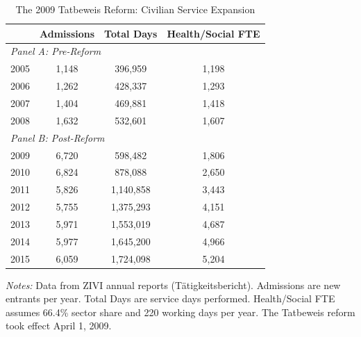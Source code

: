 \begin{table}[htbp]
\centering
\caption{The 2009 Tatbeweis Reform: Civilian Service Expansion}
\label{tab:reform}
\begin{threeparttable}
\begin{tabular}{lccc}
\toprule
 & Admissions & Total Days & Health/Social FTE \\
\midrule
\multicolumn{4}{l}{\textit{Panel A: Pre-Reform}} \\
2005 & 1,148 & 396,959 & 1,198 \\
2006 & 1,262 & 428,337 & 1,293 \\
2007 & 1,404 & 469,881 & 1,418 \\
2008 & 1,632 & 532,601 & 1,607 \\
\midrule
\multicolumn{4}{l}{\textit{Panel B: Post-Reform}} \\
2009 & 6,720 & 598,482 & 1,806 \\
2010 & 6,824 & 878,088 & 2,650 \\
2011 & 5,826 & 1,140,858 & 3,443 \\
2012 & 5,755 & 1,375,293 & 4,151 \\
2013 & 5,971 & 1,553,019 & 4,687 \\
2014 & 5,977 & 1,645,200 & 4,966 \\
2015 & 6,059 & 1,724,098 & 5,204 \\
\bottomrule
\end{tabular}
\begin{tablenotes}[flushleft]\small
\item \textit{Notes:} Data from ZIVI annual reports (T\"atigkeitsbericht). Admissions are new entrants per year. Total Days are service days performed. Health/Social FTE assumes 66.4\% sector share and 220 working days per year. The Tatbeweis reform took effect April 1, 2009.
\end{tablenotes}
\end{threeparttable}
\end{table}
